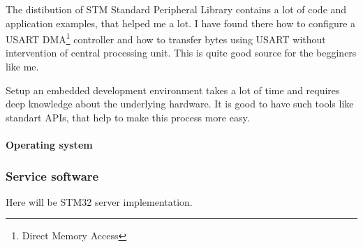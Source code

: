 The distibution of STM Standard Peripheral Library contains a lot of
code and application examples, that helped me a lot. I have found there how to
configure a USART DMA\footnote{Direct Memory Access} controller and how to
transfer bytes using USART without intervention of central processing unit.
This is  quite good source for the begginers like me.

Setup an embedded development environment takes a lot of time and requires
deep knowledge about the underlying hardware. It is good to have such tools like
standart APIs, that help to make this process more easy.

\paragraph{Operating system}



\subsubsection{Service software}
Here will be STM32 server implementation.







% 
% 


